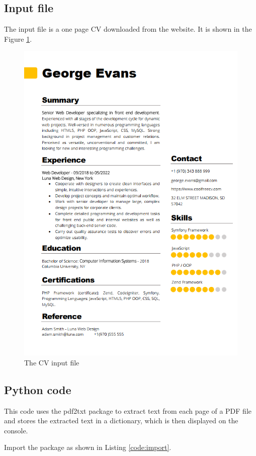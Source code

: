 \subsection{Input file}

The input file is a one page CV downloaded from the  website. It is shown in the Figure \ref{fig:CV}.

\begin{figure}[h!]
	\centering
	\includegraphics[width=.7\textwidth]{Images/pdf2txt/CVinput.png}
	\caption{The CV input file} \label{fig:CV}
\end{figure}

\subsection{Python code}

This code uses the pdf2txt package to extract text from each page of a PDF file and stores the extracted text in a dictionary, which is then displayed on the console.

Import the  package as shown in Listing \ref{code:import}.

\begin{code}[h!]
	    
	
	\caption{Importing the  package}
	\label{code:import}
\end{code}

